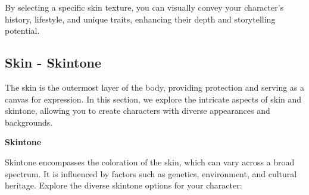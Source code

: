\documentclass[12pt]{book}
\begin{document}
By selecting a specific skin texture, you can visually convey your character's history, lifestyle, and unique traits, enhancing their depth and storytelling potential.

\subsection{\textbf{Skin  - Skintone}}

The skin is the outermost layer of the body, providing protection and serving as a canvas for expression. In this section, we explore the intricate aspects of skin and skintone, allowing you to create characters with diverse appearances and backgrounds.

\textbf{Skintone}

Skintone encompasses the coloration of the skin, which can vary across a broad spectrum. It is influenced by factors such as genetics, environment, and cultural heritage. Explore the diverse skintone options for your character:
\end{document}
